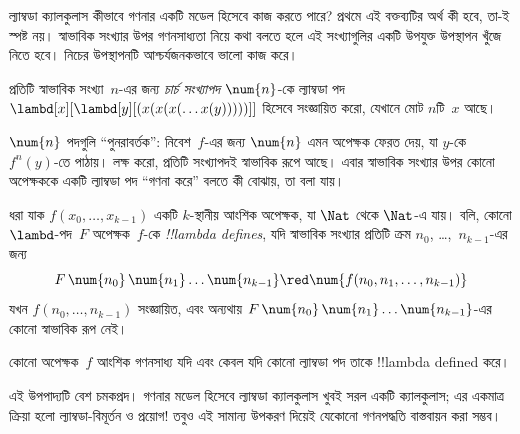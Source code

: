 \documentclass[../../../include/open-logic-section]{subfiles}
\begin{document}

ল্যাম্বডা ক্যালকুলাস কীভাবে গণনার একটি মডেল হিসেবে কাজ করতে পারে? প্রথমে
এই বক্তব্যটির অর্থ কী হবে, তা-ই স্পষ্ট নয়। স্বাভাবিক সংখ্যার উপর
গণনসাধ্যতা নিয়ে কথা বলতে হলে এই সংখ্যাগুলির একটি উপযুক্ত উপস্থাপন খুঁজে
নিতে হবে। নিচের উপস্থাপনটি আশ্চর্যজনকভাবে ভালো কাজ করে।

\begin{defn}
প্রতিটি স্বাভাবিক সংখ্যা~$n$-এর জন্য \emph{চার্চ সংখ্যাপদ}
$\num{n}$-কে ল্যাম্বডা পদ $\lambd[x][\lambd[y][(x(x(x(\dots
x(y)))))]]$ হিসেবে সংজ্ঞায়িত করো, যেখানে মোট $n$টি~$x$ আছে।
\end{defn}

$\num{n}$ পদগুলি ``পুনরাবর্তক'': নিবেশ~$f$-এর জন্য $\num{n}$ এমন অপেক্ষক
ফেরত দেয়, যা $y$-কে~$f^n(y)$-তে পাঠায়। লক্ষ করো, প্রতিটি সংখ্যাপদই
স্বাভাবিক রূপে আছে। এবার স্বাভাবিক সংখ্যার উপর কোনো অপেক্ষককে একটি
ল্যাম্বডা পদ ``গণনা করে'' বলতে কী বোঝায়, তা বলা যায়।

\begin{defn}
ধরা যাক $f(x_0, \dots, x_{k-1})$ একটি $k$-স্থানীয় আংশিক অপেক্ষক, যা
$\Nat$ থেকে $\Nat$-এ যায়। বলি, কোনো $\lambd$-পদ~$F$
অপেক্ষক~$f$-কে \emph{!!{lambda define}s}, যদি স্বাভাবিক সংখ্যার প্রতিটি
ক্রম $n_0$, \dots,~$n_{k-1}$-এর জন্য
\[
F\, \num{n_0}\, \num{n_1} \dots \num{n_{k-1}} \red \num{f(n_0, n_1, \dots,
  n_{k-1})}
\]
যখন $f(n_0, \dots, n_{k-1})$ সংজ্ঞায়িত, এবং অন্যথায় $F\, \num{n_0}\,
\num{n_1} \dots \num{n_{k-1}}$-এর কোনো স্বাভাবিক রূপ নেই।
\end{defn}

\begin{thm}
কোনো অপেক্ষক~$f$ আংশিক গণনসাধ্য যদি এবং কেবল যদি কোনো ল্যাম্বডা পদ
তাকে !!{lambda defined} করে।
\end{thm}

\begin{explain}
এই উপপাদ্যটি বেশ চমকপ্রদ। গণনার মডেল হিসেবে ল্যাম্বডা ক্যালকুলাস খুবই
সরল একটি ক্যালকুলাস; এর একমাত্র ক্রিয়া হলো ল্যাম্বডা-বিমূর্তন ও প্রয়োগ!{}
তবুও এই সামান্য উপকরণ দিয়েই যেকোনো গণনপদ্ধতি বাস্তবায়ন করা সম্ভব।
\end{explain}
\end{document}
